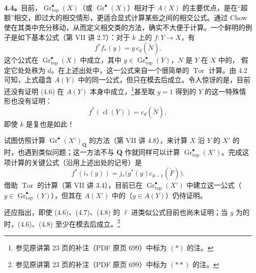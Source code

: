 \textbf{4.4。}目前，$\operatorname{Gr}_{\mathrm{top}}^\bullet(X)$（或 $\operatorname{Gr}^\bullet(X)$）相对于  $A(X)$ 的主要优点，是在“超额”相交，即过大的相交情形，更适合显式计算某些之间的相交公式。通过 Chow 使在其类中充分移动，从而定义相交类的方法，确实不大便于计算。一个鲜明的例子是如下基本公式（第 VII 讲 2.7）：对于 $k$ 上的 $f:Y\to X$，有
\[f^*f_*(y)=y\,c_d(\check N).\tag{4.6}\]
这个公式在 $\operatorname{Gr}_{\mathrm{top}}^\bullet(X)$ 中成立，其中 $y\in\operatorname{Gr}_{\mathrm{top}}^\bullet(Y)$，$N$ 是 $Y$ 在 $X$ 中的，
假定它处处秩为 $d$。在上述出处中，这一公式来自一个很简单的 $\operatorname{Tor}$ 计算。由 4.2 可知，上式蕴含 $A(Y)$ 中的同一公式，但只在模去后成立。令人惊讶的是，目前还没有证明 (4.6) 在 $A(Y)$ 本身中成立，\footnote{参见原讲第 23 页的补注（PDF 原页 699）中标为 $(*)$ 的注。}甚至取 $y=1$ 得到的 $Y$ 的这一特殊情形也没有证明：
\[f^*(\operatorname{cl}(Y))=c_d(\check N),\tag{4.7}\]
即使 $k$ 是复也是如此！

试图仿照计算 $\operatorname{Gr}^\bullet(X')_{\mathbf Q}$ 的方法（第 VII 讲 4.8），来计算 $X$ 沿 $Y$ 的 $X'$ 的 时，也遇到类似问题；这一方法不与 $\mathbf Q$ 作就同样可以计算 $\operatorname{Gr}_{\mathrm{top}}^\bullet(X')$。完成这项计算的关键公式（沿用上述出处的记号）是
\[f^*(i_*(y))=j_*\bigl(g^*(y)c_{d-1}(\check F)\bigr).\tag{4.8}\]
借助 $\operatorname{Tor}$ 的计算（第 VII 讲 3.4），目前已在 $\operatorname{Gr}_{\mathrm{top}}^\bullet(X')$ 中建立这一公式（$y\in\operatorname{Gr}_{\mathrm{top}}^\bullet(Y)$），但其在 $A(X')$ 中的（$y\in A(Y)$）仍待证明。

还应指出，即使 (4.6)、(4.7)、(4.8) 的 $\ell$ 进类似公式目前也尚未证明；当 $y$ 为的时，(4.6)、(4.8) 至少在模去后成立。\footnote{参见原讲第 23 页的补注（PDF 原页 699）中标为 $(**)$ 的注。}

